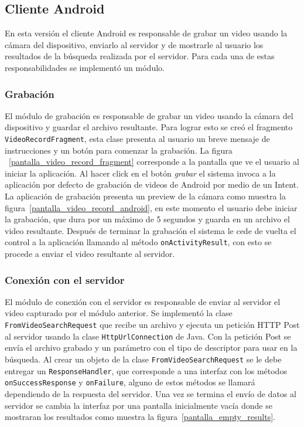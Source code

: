 \subsection{Cliente Android}
En esta versión el cliente Android es responsable de grabar un video usando la cámara del dispositivo, enviarlo al servidor y de mostrarle al usuario los resultados de la búsqueda realizada por el servidor. Para cada una de estas responsabilidades se implementó un módulo.

\subsubsection*{Grabación}

El módulo de grabación es responsable de grabar un video usando la cámara del dispositivo y guardar el archivo resultante. Para lograr esto se creó el fragmento \texttt{VideoRecordFragment}, esta clase presenta al usuario un breve mensaje de instrucciones y un botón para comenzar la grabación. La figura ~\ref{pantalla_video_record_fragment} corresponde a la pantalla que ve el usuario al iniciar la aplicación. Al hacer click en el botón \emph{grabar} el sistema invoca a la aplicación por defecto de grabación de videos de Android por medio de un Intent.
La aplicación de grabación presenta un preview de la cámara como muestra la figura~\ref{pantalla_video_record_android}, en este momento el usuario debe iniciar la grabación, que dura por un máximo de 5 segundos y guarda en un archivo el video resultante. Después de terminar la grabación el sistema le cede de vuelta el control a la aplicación llamando al método \texttt{onActivityResult}, con esto se procede a enviar el video resultante al servidor.

\subsubsection*{Conexión con el servidor}
El módulo de conexión con el servidor es responsable de enviar al servidor el video capturado por el módulo anterior. Se implementó la clase \texttt{FromVideoSearchRequest} que recibe un archivo y ejecuta un petición HTTP Post al servidor usando la clase \texttt{HttpUrlConnection} de Java. Con la petición Post se envía el archivo grabado y un parámetro con el tipo de descriptor para usar en la búsqueda. Al crear un objeto de la clase \texttt{FromVideoSearchRequest} se le debe entregar un \texttt{ResponseHandler}, que corresponde a una interfaz con los métodos \texttt{onSuccessResponse} y \texttt{onFailure}, alguno de estos métodos se llamará dependiendo de la respuesta del servidor.
Una vez se termina el envío de datos al servidor se cambia la interfaz por una pantalla inicialmente vacía donde se mostraran los resultados como muestra la figura~\ref{pantalla_empty_results}.

